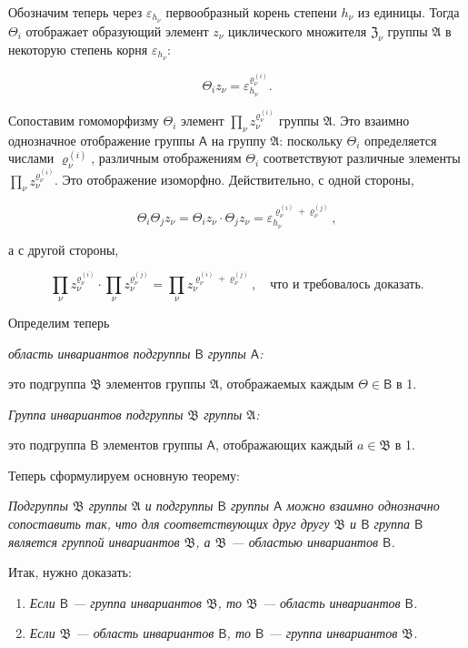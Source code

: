 \documentclass[11pt]{article}
\begin{document}
Обозначим теперь через \(\varepsilon_{h_\nu}\) первообразный корень степени \(h_\nu\) из единицы. Тогда \(\Theta_i\) отображает образующий элемент \(z_\nu\) циклического множителя \(\mathfrak Z_\nu\) группы \(\mathfrak A\) в некоторую степень корня \(\varepsilon_{h_\nu}\):

\[
\Theta_i z_\nu=\varepsilon_{h_\nu}^{\varrho_\nu^{(i)}}.
\]

Сопоставим гомоморфизму \(\Theta_i\) элемент \(\prod_\nu z_\nu^{\varrho_\nu^{(i)}}\) группы \(\mathfrak A\). Это взаимно однозначное отображение группы \(\mathsf A\) на группу \(\mathfrak A\): поскольку \(\Theta_i\) определяется числами \(\varrho_\nu^{(i)}\), различным отображениям \(\Theta_i\) соответствуют различные элементы \(\prod_\nu z_\nu^{\varrho_\nu^{(i)}}\). Это отображение изоморфно. Действительно, с одной стороны,

\[
\Theta_i\Theta_j z_\nu=\Theta_i z_\nu\cdot \Theta_j z_\nu
=\varepsilon_{h_\nu}^{\varrho_\nu^{(i)}+\varrho_\nu^{(j)}},
\]

а с другой стороны,

\[
\prod_\nu z_\nu^{\varrho_\nu^{(i)}}\cdot
\prod_\nu z_\nu^{\varrho_\nu^{(j)}}=
\prod_\nu z_\nu^{\varrho_\nu^{(i)}+\varrho_\nu^{(j)}},
\quad\text{что и требовалось доказать.}
\]

Определим теперь

\emph{область инвариантов подгруппы \(\mathsf B\) группы \(\mathsf A\):}

это подгруппа \(\mathfrak B\) элементов группы \(\mathfrak A\), отображаемых каждым \(\Theta\in\mathsf B\) в 1.

\emph{Группа инвариантов подгруппы \(\mathfrak B\) группы \(\mathfrak A\):}

это подгруппа \(\mathsf B\) элементов группы \(\mathsf A\), отображающих каждый \(a\in\mathfrak B\) в 1.

Теперь сформулируем основную теорему:

\emph{Подгруппы \(\mathfrak B\) группы \(\mathfrak A\) и подгруппы \(\mathsf B\) группы \(\mathsf A\) можно взаимно однозначно сопоставить так, что для соответствующих друг другу \(\mathfrak B\) и \(\mathsf B\) группа \(\mathsf B\) является группой инвариантов \(\mathfrak B\), а \(\mathfrak B\) --- областью инвариантов \(\mathsf B\).}

Итак, нужно доказать:

\begin{enumerate}
\item \emph{Если \(\mathsf B\) --- группа инвариантов \(\mathfrak B\), то \(\mathfrak B\) --- область инвариантов \(\mathsf B\).}
\item \emph{Если \(\mathfrak B\) --- область инвариантов \(\mathsf B\), то \(\mathsf B\) --- группа инвариантов \(\mathfrak B\).}
\end{enumerate}
\end{document}
